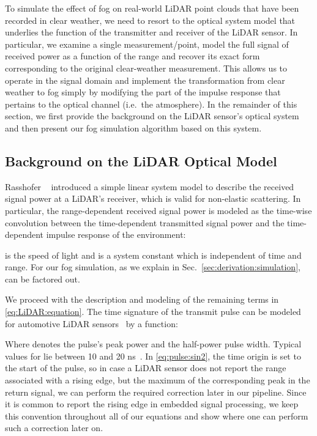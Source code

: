 \documentclass[10pt,twocolumn,letterpaper]{article}
\begin{document}
To simulate the effect of fog on real-world LiDAR point clouds that have been recorded in clear weather, we need to resort to the optical system model that underlies the function of the transmitter and receiver of the LiDAR sensor. In particular, we examine a single measurement/point, model the full signal of received power as a function of the range and recover its exact form corresponding to the original clear-weather measurement. This allows us to operate in the signal domain and implement the transformation from clear weather to fog simply by modifying the part of the impulse response that pertains to the optical channel (i.e.\ the atmosphere). In the remainder of this section, we first provide the background on the LiDAR sensor's optical system and then present our fog simulation algorithm based on this system. 

\subsection{Background on the LiDAR Optical Model}
\label{sec:derivation:background}

Rasshofer \etal~\cite{Rasshofer_2011} introduced a simple linear system model to describe the received signal power at a LiDAR's receiver, which is valid for non-elastic scattering. In particular, the range-dependent received signal power  is modeled as the time-wise convolution between the time-dependent transmitted signal power  and the time-dependent impulse response  of the environment:

 is the speed of light and  is a system constant which is independent of time and range. For our fog simulation, as we explain in Sec.~\ref{sec:derivation:simulation},  can be factored out.

We proceed with the description and modeling of the remaining terms in \eqref{eq:LiDAR:equation}. The time signature of the transmit pulse can be modeled for automotive LiDAR sensors~\cite{Rasshofer_2011} by a  function:

Where  denotes the pulse's peak power and  the half-power pulse width. Typical values for  lie between 10 and 20 ns~\cite{Rasshofer_2011}. In \eqref{eq:pulse:sin2}, the time origin is set to the start of the pulse, so in case a LiDAR sensor does not report the range associated with a rising edge, but the maximum of the corresponding peak in the return signal, we can perform the required correction later in our pipeline. Since it is common to report the rising edge in embedded signal processing, we keep this convention throughout all of our equations and show where one can perform such a correction later on. 
\end{document}
